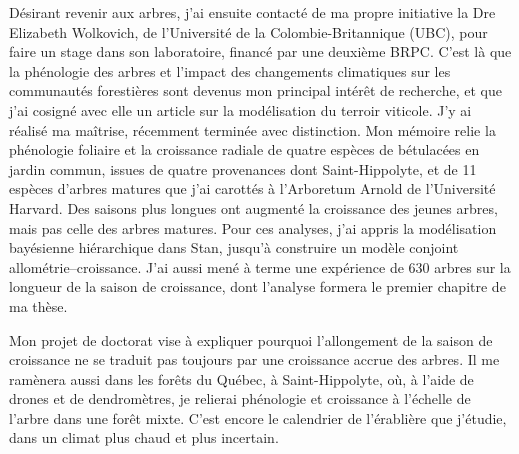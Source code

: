 \documentclass[12pt]{article}
\begin{document}
Désirant revenir aux arbres, j'ai ensuite contacté de ma propre initiative la Dre Elizabeth Wolkovich, de l'Université de la Colombie-Britannique (UBC), pour faire un stage dans son laboratoire, financé par une deuxième BRPC. C'est là que la phénologie des arbres et l'impact des changements climatiques sur les communautés forestières sont devenus mon principal intérêt de recherche, et que j'ai cosigné avec elle un article sur la modélisation du terroir viticole. J'y ai réalisé ma maîtrise, récemment terminée avec distinction. Mon mémoire relie la phénologie foliaire et la croissance radiale de quatre espèces de bétulacées en jardin commun, issues de quatre provenances dont Saint-Hippolyte, et de 11 espèces d'arbres matures que j'ai carottés à l'Arboretum Arnold de l'Université Harvard. Des saisons plus longues ont augmenté la croissance des jeunes arbres, mais pas celle des arbres matures. Pour ces analyses, j'ai appris la modélisation bayésienne hiérarchique dans Stan, jusqu'à construire un modèle conjoint allométrie--croissance. J'ai aussi mené à terme une expérience de 630 arbres sur la longueur de la saison de croissance, dont l'analyse formera le premier chapitre de ma thèse.

Mon projet de doctorat vise à expliquer pourquoi l'allongement de la saison de croissance ne se traduit pas toujours par une croissance accrue des arbres. Il me ramènera aussi dans les forêts du Québec, à Saint-Hippolyte, où, à l'aide de drones et de dendromètres, je relierai phénologie et croissance à l'échelle de l'arbre dans une forêt mixte. C'est encore le calendrier de l'érablière que j'étudie, dans un climat plus chaud et plus incertain.
\end{document}
